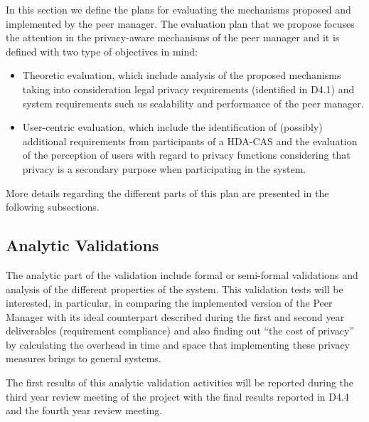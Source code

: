 
  
  


In this section we define the plans for evaluating the mechanisms proposed and implemented by the peer manager.
The evaluation plan that we propose focuses the attention in the privacy-aware mechanisms of the peer manager and it is defined with two type of objectives in mind:
\begin{itemize}
\item Theoretic evaluation, which include analysis of the proposed mechanisms taking into consideration legal privacy requirements (identified in D4.1) and system requirements such us scalability and performance of the peer manager.
\item User-centric evaluation, which include the identification of (possibly) additional requirements from participants of a HDA-CAS and the evaluation of the perception of users with regard to privacy functions considering that privacy is a secondary purpose when participating in the system.
\end{itemize}
More details regarding the different parts of this plan are presented in the following subsections.

\subsection{Analytic Validations}
The analytic part of the validation include formal or semi-formal validations and analysis of the different properties of the system. This validation tests will be interested, in particular, in comparing the implemented version of the Peer Manager with its ideal counterpart described during the first and second year deliverables (requirement compliance) and also finding out ``the cost of privacy'' by calculating the overhead in time and space that implementing these privacy measures brings to general systems.

The first results of this analytic validation activities will be reported during the third year review meeting of the project with the final results reported in D4.4 and the fourth year review meeting.

